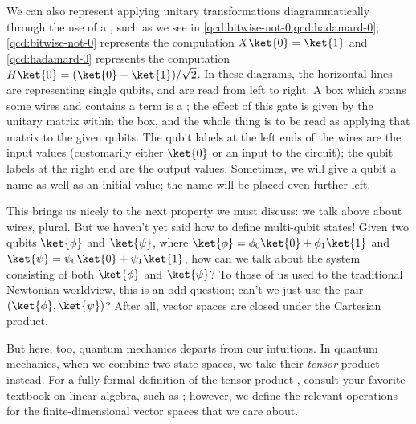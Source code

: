 We can also represent applying unitary transformations diagrammatically through
the use of a , such as we see in
\cref{qcd:bitwise-not-0,qcd:hadamard-0}; \cref{qcd:bitwise-not-0} represents the
computation $X\ket{0} = \ket{1}$ and \cref{qcd:hadamard-0} represents the
computation $H\ket{0} = (\ket{0} + \ket{1})/\sqrt{2}$.  In these diagrams, the
horizontal lines are  representing single qubits, and are read from
left to right.  A box which spans some wires and contains a term is a
; the effect of this gate is given by the unitary matrix within the
box, and the whole thing is to be read as applying that matrix to the given
qubits.\footnotemark{} The qubit labels at the left ends of the wires are the
input values (customarily either $\ket{0}$ or an input to the circuit); the
qubit labels at the right end are the output values.  Sometimes, we will give a
qubit a name as well as an initial value; the name will be placed even further
left.


This brings us nicely to the next property we must discuss: we talk above about
wire\emph{s}, plural.  But we haven't yet said how to define multi-qubit states!
Given two qubits $\ket{\phi}$ and $\ket{\psi}$, where $\ket{\phi} =
\phi_0\ket{0} + \phi_1\ket{1}$ and $\ket{\psi} = \psi_0\ket{0} + \psi_1\ket{1}$,
how can we talk about the system consisting of both $\ket{\phi}$ and
$\ket{\psi}$?  To those of us used to the traditional Newtonian worldview, this
is an odd question; can't we just use the pair $(\ket{\phi},\ket{\psi})$?  After
all, vector spaces are closed under the Cartesian product.

But here, too, quantum mechanics departs from our intuitions.  In quantum
mechanics, when we combine two state spaces, we take their \emph{tensor} product
instead.  For a fully formal definition of the tensor product  , consult your favorite textbook on linear algebra,
such as \cite{gallier13}; however, we define the relevant operations for the
finite-dimensional vector spaces that we care about.

